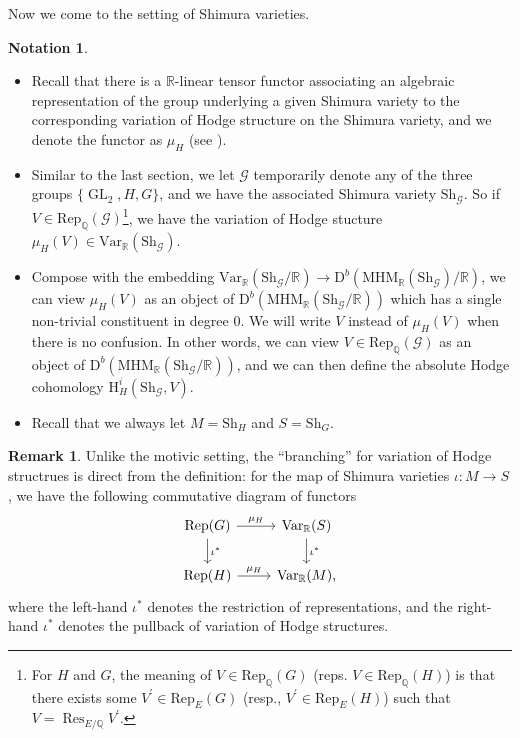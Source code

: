 \documentclass[11pt, a4paper]{amsart}
\theoremstyle{plain}
\theoremstyle{definition}
\newtheorem{remark}[theorem]{Remark}
\newtheorem{notation}[theorem]{Notation}
\numberwithin{equation}{section}
\def\calG{\mathcal{G}}
\def\QQ{\mathbb{Q}}
\def\RR{\mathbb{R}}
\DeclareMathOperator{\Res}{Res}
\DeclareMathOperator{\GL}{\mathrm{GL}}
\newcommand{\Sh}{\mathrm{Sh}}
\begin{document}
Now we come to the setting of Shimura varieties. 
\begin{notation}
\begin{itemize}
  \item 
    Recall that there is a $\RR$-linear tensor functor associating an algebraic representation of the group underlying a given Shimura variety to the corresponding variation of Hodge structure on the  Shimura variety, and we denote the functor as $\mu_{H}$ (see \cite[2]{Bow04}). 
  \item Similar to the last section, we let $\mathcal{G}$ temporarily denote any of the three groups $\{\GL_2,   H, G \}$, and we have the associated Shimura variety $\Sh_{\calG}$. So if $V \in \mathrm{Rep}_{\QQ}(\mathcal{G})$\footnote{For $H$ and $G$, the meaning of $V \in \mathrm{Rep}_{\QQ}(G)$ (reps. $V \in \mathrm{Rep}_{\QQ}(H)$) is that there exists some $V^{\prime} \in \mathrm{Rep}_{E}(G)$ (resp., $V^{\prime} \in \mathrm{Rep}_{E}(H)$) such that  $V = \Res_{E/\QQ} V^{\prime}$. }, we have the variation of Hodge stucture $\mu_{H}(V) \in \mathrm{Var}_{\RR}(\Sh_{\mathcal{G}})$. 
  \item Compose with the embedding $\mathrm{Var}_{\RR}(\Sh_{\mathcal{G}}/\RR) \rightarrow \mathrm{D}^{b}(\mathrm{MHM}_{\RR}(\Sh_{\mathcal{G}})/\RR)$, we can view $\mu_{H}(V)$ as an object of $\mathrm{D}^{b}(\mathrm{MHM}_{\RR}(\Sh_{\mathcal{G}}/\RR))$ which has a single non-trivial constituent in degree $0$. We will write $V$ instead of $\mu_{H}(V)$ when there is no confusion. In other words, we can view $V \in \mathrm{Rep}_{\QQ}(\mathcal{G})$ as an object of $\mathrm{D}^{b}(\mathrm{MHM}_{\RR}(\Sh_{\mathcal{G}}/\RR))$, and we can then define the absolute Hodge cohomology $\mathrm{H}_{H}^{i}(\Sh_{\mathcal{G}}, V)$. 
  \item Recall that we always let $M = \Sh_{H}$ and $S = \Sh_{G}$. 
\end{itemize}
\end{notation}

\begin{remark}
    Unlike the motivic setting, the ``branching'' for variation of Hodge structrues is direct from the definition: 
    for the map of Shimura varieties $\iota \colon M \rightarrow S$, we have the following commutative diagram of functors 
    \[
        \begin{tikzcd}
            \mathrm{Rep}(G) \ar[d, "\iota^{*}"] \ar[r, "\mu_{H}"] & \mathrm{Var}_{\RR}(S) \ar[d, "\iota^{*}"] \\
            \mathrm{Rep}(H) \ar[r, "\mu_{H}"] & \mathrm{Var}_{\RR}(M), 
        \end{tikzcd}
    \]
where the left-hand $\iota^{*}$ denotes the restriction of representations, and the right-hand $\iota^{*}$ denotes the pullback of variation of Hodge structures.
\end{remark}
\end{document}
